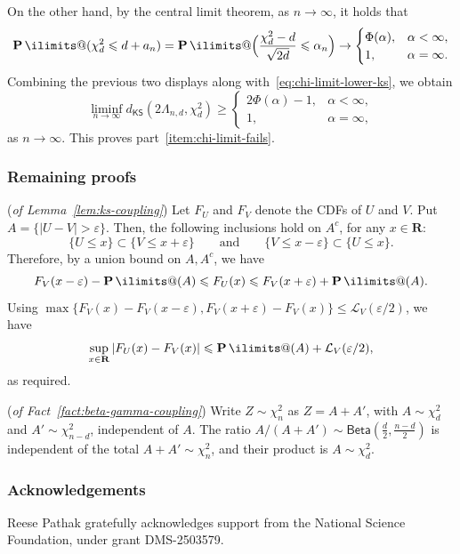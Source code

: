 \documentclass[11pt, letterpaper, hidelinks]{article}
\makeatletter
\renewcommand{\proofname}{\textit{\textbf{Proof}}}
\renewenvironment{proof}[1][\proofname]{\par\pushQED{\qed}\normalfont \topsep6\p@\@plus6\p@\relax\trivlist\item[\hskip\labelsep#1\@addpunct{}]\ignorespaces}{\popQED\endtrivlist\@endpefalse}
\newcommand{\R}{\mathbf R}
\newcommand{\cL}{\mathcal{L}}
\newcommand{\1}{\mathbf 1}
\newcommand{\eps}{\varepsilon}
\let\subseteq\subset
\renewcommand{\leq}{\leqslant}
\renewcommand{\geq}{\geqslant}
\renewcommand{\P}{\operatorname*{\mathbf{P}}\ilimits@}
\theoremstyle{plain}
\theoremstyle{definition}
\newcommand{\defn}{=}
\newcommand{\KSDist}[2]{d_{\mathsf{KS}}\left(#1, #2\right)}
\makeatother
\begin{document}
On the other hand, by the central limit theorem, as $n \to \infty$, it holds that 
\[
\P(\chi^2_d\leq d+a_n)
=
\P\Bigl(\frac{\chi^2_d-d}{\sqrt{2d}}\leq \alpha_n\Bigr)
\to
\begin{cases}
\Phi(\alpha), & \alpha<\infty,\\
1, & \alpha=\infty.
\end{cases}
\]
Combining the previous two displays along with~\cref{eq:chi-limit-lower-ks}, we obtain
\[
\liminf_{n \to \infty}\KSDist{2\Lambda_{n,d}}{\chi^2_d}
\geq
\begin{cases}
2\Phi(\alpha)-1, & \alpha<\infty,\\
1, & \alpha=\infty,
\end{cases}
\]
as $n \to \infty$. This proves part~\ref{item:chi-limit-fails}.

\subsubsection{Remaining proofs}
\label{sec:asymp-remaining-proofs}

\begin{proof}(\emph{of Lemma~\ref{lem:ks-coupling}})
Let $F_U$ and $F_V$ denote the CDFs of $U$ and $V$. Put $A\defn \{|U-V|>\eps\}$. 
Then, the following inclusions hold on $A^c$, for any $x \in \R$: 
\[
\{U\leq x\}\subseteq \{V\leq x+\eps\}
\qquad\mbox{and}\qquad
\{V\leq x-\eps\}\subseteq \{U\leq x\}.
\]
Therefore, by a union bound on $A, A^c$, we have 
\[
F_V(x-\eps)-\P(A)\leq F_U(x)\leq F_V(x+\eps)+\P(A).
\]
Using $\max\{F_V(x) - F_V(x -\eps), F_V(x+\eps) - F_V(x)\} \leq \cL_V(\eps/2)$, we have
\[
\sup_{x \in \R}|F_U(x)-F_V(x)|\leq \P(A)+ \cL_V(\eps/2),
\]
as required.
\end{proof}


\begin{proof}(\emph{of Fact~\ref{fact:beta-gamma-coupling}})
Write $Z\sim \chi^2_n$ as $Z = A + A'$, with $A\sim\chi^2_d$ and $A'\sim\chi^2_{n-d}$, independent of $A$. The ratio $A/(A+A')\sim\mathsf{Beta}(\tfrac d2,\tfrac{n-d}{2})$ is independent of the total $A+A'\sim\chi^2_n$, and their product is $A\sim\chi^2_d$.
\end{proof}

\subsubsection*{Acknowledgements}

Reese Pathak gratefully acknowledges support from the National Science
Foundation, under grant DMS-2503579.
\end{document}
